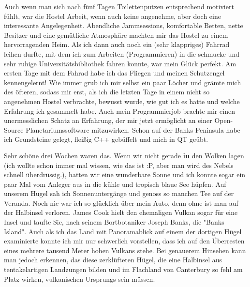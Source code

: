 Auch wenn man sich nach fünf Tagen Toilettenputzen entsprechend
motiviert fühlt, war die Hostel Arbeit, wenn auch keine angenehme, aber
doch eine interessante Angelegenheit. Abendliche Jammsessions,
komfortable Betten, nette Besitzer und eine gemütliche Atmosphäre
machten mir das Hostel zu einem hervorragenden Heim. Als ich dann auch
noch ein (sehr klappriges) Fahrrad leihen durfte, mit dem ich zum
Arbeiten (Programmieren) in die schmucke und sehr ruhige
Universitätsbibliothek fahren konnte, war mein Glück perfekt. Am ersten
Tage mit dem Fahrad habe ich das Fliegen und meinen Schutzengel
kennengelernt! Wie immer grub ich mir selbst ein paar Löcher und grämte
mich des öfteren, sodass mir erst, als ich die letzten Tage in einem
nicht so angenehmen Hostel verbrachte, bewusst wurde, wie gut ich es
hatte und welche Erfahrung ich gesammelt habe. Auch mein Programmierjob
brachte mir einen unermesslichen Schatz an Erfahrung, der mir jetzt
ermöglicht an einer Open-Source Planetariumssoftware mitzuwirken. Schon
auf der Banks Peninsula habe ich Grundsteine gelegt, fleißig C++
gebüffelt und mich in QT geübt.

Sehr schöne drei Wochen waren das. Wenn wir nicht gerade
\textbf{\textbf{in}} den Wolken lagen (ich wollte schon immer mal
wissen, wie das ist :P, aber man wird des Nebels schnell überdrüssig.),
hatten wir eine wunderbare Sonne und ich konnte sogar ein paar Mal vom
Anleger aus in die kühle und tropisch blaue See hüpfen. Auf unserem
Hügel sah ich Sonnenuntergänge und genoss so manchen Tee auf der
Veranda. Noch nie war ich so glücklich über mein Auto, denn ohne ist man
auf der Halbinsel verloren. James Cook hielt den ehemaligen Vulkan sogar
für eine Insel und taufte Sie, nach seinem Bortbotaniker Joseph Banks,
die "Banks Island". Auch als ich das Land mit Panoramablick auf einem
der dortigen Hügel examinierte konnte ich mir nur schwerlich vorstellen,
dass ich auf den Überresten eines mehrere tausend Meter hohen Vulkans
stehe. Bei genauerem Hinsehen kann man jedoch erkennen, das diese
zerklüfteten Hügel, die eine Halbinsel aus tentakelartigen Landzungen
bilden und im Flachland von Canterbury so fehl am Platz wirken,
vulkanischen Ursprungs sein müssen.

